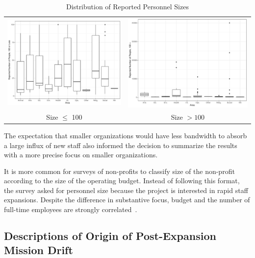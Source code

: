 \begin{table}
\centering
\begin{tabular}{cc}
    \includegraphics[width=.45\columnwidth]{./Pictures/censoredsizebysector.pdf}
&
    \includegraphics[width=.45\columnwidth]{./Pictures/censoredsizebysectorbig.pdf}
\\
Size $\leq$ 100 &  Size $> 100 $ \\
\end{tabular}
    \caption{Distribution of Reported Personnel Sizes}
    \label{fig:censoredsizes}
\end{table}



The expectation that smaller organizations would have less bandwidth to absorb a large influx of new staff also informed the decision to summarize the results with a more precise focus on smaller organizations.

It is more common for surveys of non-profits to classify size of the non-profit according to the size of the operating budget. Instead of following this format, the survey asked for personnel size because the project is interested in rapid staff expansions. Despite the difference in substantive focus, budget and the number of full-time employees are strongly correlated~\autocite{carman2009nonprofits}.  

\subsection{Descriptions of Origin of Post-Expansion Mission Drift}

